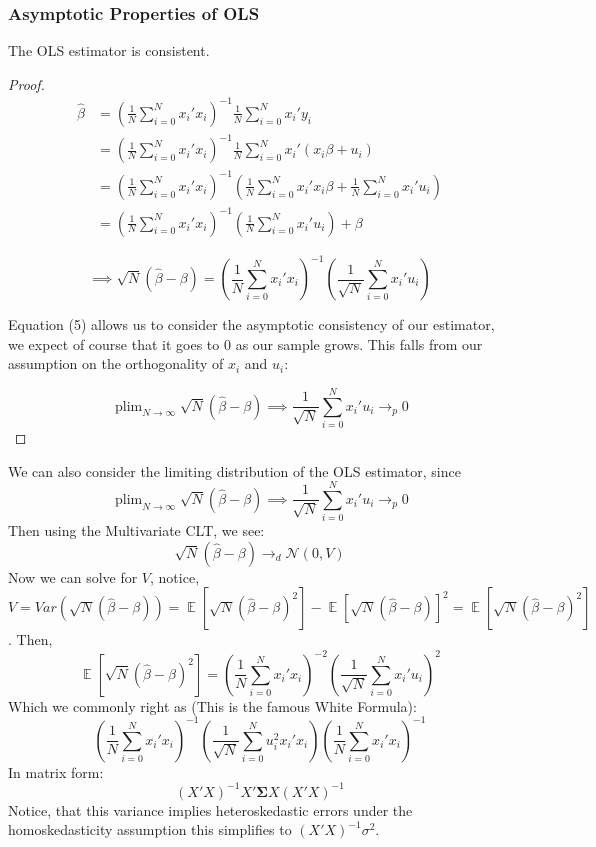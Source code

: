 \documentclass[dvips,11pt]{article}
\DeclareMathOperator{\?}{\,?\,}
\DeclareMathOperator{\E}{\mathbb{E}}
\DeclareMathOperator*{\plim}{plim}
\newenvironment{claim}[1]{\par\noindent{\bfseries Claim.}\space#1}{}
\begin{document}
\subsubsection{Asymptotic Properties of OLS}
\begin{claim} The OLS estimator is consistent.
\end{claim}
\begin{proof}
$$
\begin{aligned}
\hat\beta &= (\frac{1}{N}\sum^N_{i=0}x_i'x_i)^{-1}\frac{1}{N}\sum^N_{i=0}x_i'y_i \\
&= (\frac{1}{N}\sum^N_{i=0}x_i'x_i)^{-1}\frac{1}{N}\sum^N_{i=0}x_i'(x_i\beta+u_i) \\
&= (\frac{1}{N}\sum^N_{i=0}x_i'x_i)^{-1}(\frac{1}{N}\sum^N_{i=0}x_i'x_i\beta+\frac{1}{N}\sum^N_{i=0}x_i'u_i)\\
&= (\frac{1}{N}\sum^N_{i=0}x_i'x_i)^{-1}(\frac{1}{N}\sum^N_{i=0}x_i'u_i) + \beta
\end{aligned}
$$


\begin{equation}\implies \sqrt{N}(\hat\beta - \beta) = (\frac{1}{N}\sum^N_{i=0}x_i'x_i)^{-1}(\frac{1}{\sqrt{N}}\sum^N_{i=0}x_i'u_i)\end{equation}


Equation (5) allows us to consider the asymptotic consistency of our estimator, we expect of course that it goes to 0 as our sample grows. This falls from our assumption on the orthogonality of $x_i$ and $u_i$:

$$
\plim_{N\rightarrow\infty}\sqrt{N}(\hat\beta - \beta) \implies \frac{1}{\sqrt{N}}\sum^N_{i=0}x_i'u_i \rightarrow_p 0
$$
\end{proof}
We can also consider the limiting distribution of the OLS estimator, since
$$
\plim_{N\rightarrow\infty}\sqrt{N}(\hat\beta - \beta) \implies \frac{1}{\sqrt{N}}\sum^N_{i=0}x_i'u_i \rightarrow_p 0
$$
Then using the Multivariate CLT, we see:
$$
\sqrt{N}(\hat\beta - \beta) \rightarrow_d \mathcal{N}(0, V)
$$
Now we can solve for $V$, notice, $V = Var(\sqrt{N}(\hat\beta - \beta)) = \E[\sqrt{N}(\hat\beta - \beta)^2] - \E[\sqrt{N}(\hat\beta - \beta)]^2 = \E[\sqrt{N}(\hat\beta - \beta)^2]$. Then,
$$\E[\sqrt{N}(\hat\beta - \beta)^2] = (\frac{1}{N}\sum^N_{i=0}x_i'x_i)^{-2}(\frac{1}{\sqrt{N}}\sum^N_{i=0}x_i'u_i)^2$$
Which we commonly right as (This is the famous White Formula):
$$(\frac{1}{N}\sum^N_{i=0}x_i'x_i)^{-1}(\frac{1}{\sqrt{N}}\sum^N_{i=0}u_i^2x_i'x_i)(\frac{1}{N}\sum^N_{i=0}x_i'x_i)^{-1}$$
In matrix form: $$(X'X)^{-1}X'\boldsymbol{\Sigma} X(X'X)^{-1}$$
Notice, that this variance implies heteroskedastic errors under the homoskedasticity assumption this simplifies to $(X'X)^{-1}\sigma^2$.
\end{document}
